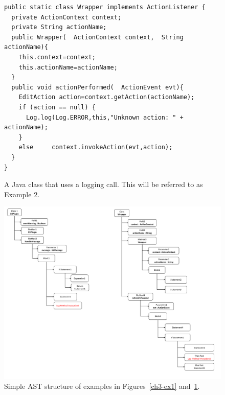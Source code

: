 \begin{figure}[H]
\def\baselinestretch{1}
\begin{lstlisting}
public static class Wrapper implements ActionListener {
  private ActionContext context;
  private String actionName;
  public Wrapper(  ActionContext context,  String actionName){
    this.context=context;
    this.actionName=actionName;
  }
  public void actionPerformed(  ActionEvent evt){
    EditAction action=context.getAction(actionName);
    if (action == null) {
      Log.log(Log.ERROR,this,"Unknown action: " + actionName);
    }
    else     context.invokeAction(evt,action);
  }
}
\end{lstlisting}
\caption{A Java class that uses a logging call. This will be referred to as Example 2.\label{ch3-ex2}}
\end{figure}

\begin{figure} [H]
  \centering\includegraphics [width = \textwidth]{Drawing4/AST.pdf}
  \caption{Simple AST structure of examples in Figures~\ref{ch3-ex1} and~\ref{ch3-ex2}.}
  \label{fig:ast}
\end{figure}

